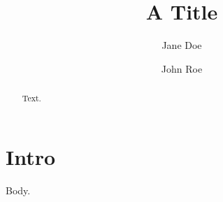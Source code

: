 \documentclass{aastex701}
\begin{document}
\title{A Title}
\author{Jane Doe}
\author{John Roe}
\begin{abstract}
Text.
\end{abstract}
\section{Intro} Body.
\end{document}
